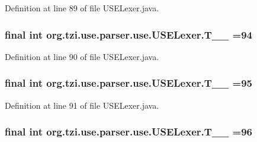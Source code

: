 Definition at line 89 of file U\-S\-E\-Lexer.\-java.

\hypertarget{classorg_1_1tzi_1_1use_1_1parser_1_1use_1_1_u_s_e_lexer_aa7f4cb3cbc24330713d025c7f55d667e}{
\subsubsection[{T\-\_\-\-\_\-94}]{\setlength{\rightskip}{0pt plus 5cm}final int org.\-tzi.\-use.\-parser.\-use.\-U\-S\-E\-Lexer.\-T\-\_\-\-\_ =94\hspace{0.3cm}{\ttfamily [static]}}}\label{classorg_1_1tzi_1_1use_1_1parser_1_1use_1_1_u_s_e_lexer_aa7f4cb3cbc24330713d025c7f55d667e}


Definition at line 90 of file U\-S\-E\-Lexer.\-java.

\hypertarget{classorg_1_1tzi_1_1use_1_1parser_1_1use_1_1_u_s_e_lexer_ab4ff8d710a407b712f8b61f9bfdf87f6}{
\subsubsection[{T\-\_\-\-\_\-95}]{\setlength{\rightskip}{0pt plus 5cm}final int org.\-tzi.\-use.\-parser.\-use.\-U\-S\-E\-Lexer.\-T\-\_\-\-\_ =95\hspace{0.3cm}{\ttfamily [static]}}}\label{classorg_1_1tzi_1_1use_1_1parser_1_1use_1_1_u_s_e_lexer_ab4ff8d710a407b712f8b61f9bfdf87f6}


Definition at line 91 of file U\-S\-E\-Lexer.\-java.

\hypertarget{classorg_1_1tzi_1_1use_1_1parser_1_1use_1_1_u_s_e_lexer_a4e59dca58ba7d5bd1424a9f924cb7676}{
\subsubsection[{T\-\_\-\-\_\-96}]{\setlength{\rightskip}{0pt plus 5cm}final int org.\-tzi.\-use.\-parser.\-use.\-U\-S\-E\-Lexer.\-T\-\_\-\-\_ =96\hspace{0.3cm}{\ttfamily [static]}}}\label{classorg_1_1tzi_1_1use_1_1parser_1_1use_1_1_u_s_e_lexer_a4e59dca58ba7d5bd1424a9f924cb7676}


